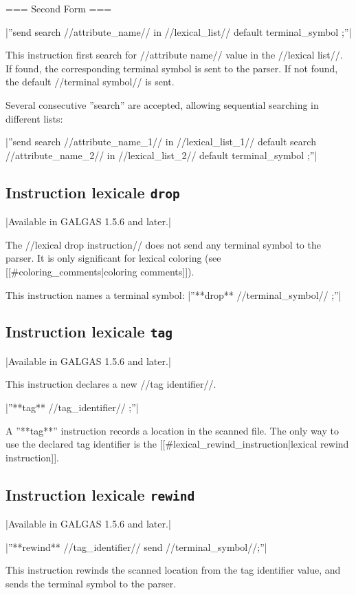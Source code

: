 {=== Second Form ===

|''send search //attribute\_name// in //lexical\_list// default terminal\_symbol ;''|

This instruction first search for //attribute name// value in the //lexical list//. If found, the corresponding terminal symbol is sent to the parser. If not found, the default //terminal symbol// is sent.

Several consecutive ''search'' are accepted, allowing sequential searching in different lists:

|''send search //attribute\_name\_1// in //lexical\_list\_1// default search //attribute\_name\_2// in //lexical\_list\_2// default terminal\_symbol ;''|

\subsection{Instruction lexicale \texttt{drop}}

|Available in GALGAS 1.5.6 and later.|


The //lexical drop instruction// does not send any terminal symbol to the parser. It is only significant for lexical coloring (see [[\#coloring\_comments|coloring comments]]).

This instruction names a terminal symbol:
|''**drop** //terminal\_symbol// ;''|


\subsection{Instruction lexicale \texttt{tag}}

|Available in GALGAS 1.5.6 and later.|

This instruction declares a new //tag identifier//.

|''**tag** //tag\_identifier// ;''|

A ''**tag**'' instruction records a location in the scanned file. The only way to use the declared tag identifier is the [[\#lexical\_rewind\_instruction|lexical rewind instruction]].

\subsection{Instruction lexicale \texttt{rewind}}

|Available in GALGAS 1.5.6 and later.|

|''**rewind** //tag\_identifier// send //terminal\_symbol//;''|

This instruction rewinds the scanned location from the tag identifier value, and sends the terminal symbol to the parser.








}
